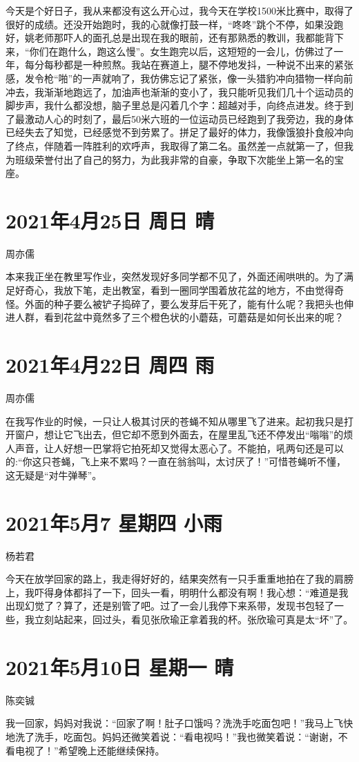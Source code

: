今天是个好日子，我从来都没有这么开心过，我今天在学校1500米比赛中，取得了很好的成绩。还没开始跑时，我的心就像打鼓一样，“咚咚”跳个不停，如果没跑好，姚老师那吓人的面孔总是出现在我的眼前，还有那熟悉的教训，我都能背下来，“你们在跑什么，跑这么慢”。女生跑完以后，这短短的一会儿，仿佛过了一年，每分每秒都是一种煎熬。我站在赛道上，腿不停地发抖，一种说不出来的紧张感，发令枪“啪”的一声就响了，我仿佛忘记了紧张，像一头猎豹冲向猎物一样向前冲去，我渐渐地跑远了，加油声也渐渐的变小了，我只能听见我们几十个运动员的脚步声，我什么都没想，脑子里总是闪着几个字：超越对手，向终点进发。终于到了最激动人心的时刻了，最后50米六班的一位运动员已经跑到了我旁边，我的身体已经失去了知觉，已经感觉不到劳累了。拼足了最好的体力，我像饿狼扑食般冲向了终点，伴随着一阵胜利的欢呼声，我取得了第二名。虽然差一点就第一了，但我为班级荣誉付出了自己的努力，为此我非常的自豪，争取下次能坐上第一名的宝座。

\section{2021年4月25日 周日 晴}

周亦儒

本来我正坐在教里写作业，突然发现好多同学都不见了，外面还闹哄哄的。为了满足好奇心，我放下笔，走出教室，看到一圈同学围着放花盆的地方，不由觉得奇怪。外面的种子要么被铲子捣碎了，要么发芽后干死了，能有什么呢？我把头也伸进人群，看到花盆中竟然多了三个橙色状的小蘑菇，可蘑菇是如何长出来的呢？

\section{2021年4月22日 周四 雨}

周亦儒

在我写作业的时候，一只让人极其讨厌的苍蝇不知从哪里飞了进来。起初我只是打开窗户，想让它飞出去，但它却不愿到外面去，在屋里乱飞还不停发出“嗡嗡”的烦人声音，让人好想一巴掌将它拍死却又觉得太恶心了。不能拍，吼两句还是可以的:“你这只苍蝇，飞上来不累吗？一直在翁翁叫，太讨厌了！”可惜苍蝇听不懂，这无疑是“对牛弹琴”。

\section{2021年5月7 星期四 小雨}

杨若君

今天在放学回家的路上，我走得好好的，结果突然有一只手重重地拍在了我的肩膀上，我吓得身体都抖了一下，回头一看，明明什么都没有啊！我心想：“难道是我出现幻觉了？算了，还是别管了吧。过了一会儿我停下来系带，发现书包轻了一些，我立刻站起来，回过头，看见张欣瑜正拿着我的杯。张欣瑜可真是太“坏”了。

\section{2021年5月10日 星期一 晴}

陈奕铖

我一回家，妈妈对我说：“回家了啊！肚子口饿吗？洗洗手吃面包吧！”我马上飞快地洗了洗手，吃面包。妈妈还微笑着说：“看电视吗！”我也微笑着说：“谢谢，不看电视了！”希望晚上还能继续保持。
